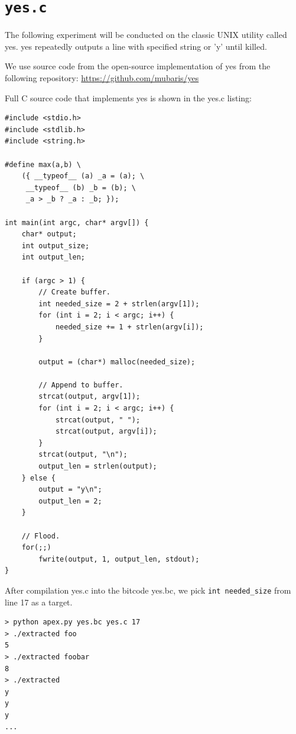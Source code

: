 \documentclass[12pt, twoside]{fithesis2}
\renewcommand{\_}{\leavevmode \kern0.07em\vbox{\hrule width0.4em}}
\begin{document}
\section{\texttt{yes.c}}
\label{sec:exp_yes}

The following experiment will be conducted on the classic UNIX utility called
yes.
yes repeatedly outputs a line with specified string or 'y' until
killed.

We use source code from the open-source implementation of yes
from the following repository: \url{https://github.com/mubaris/yes}

Full C source code that implements yes is shown in the yes.c listing:

\begin{verbatim}
#include <stdio.h>
#include <stdlib.h>
#include <string.h>

#define max(a,b) \
    ({ __typeof__ (a) _a = (a); \
     __typeof__ (b) _b = (b); \
     _a > _b ? _a : _b; });

int main(int argc, char* argv[]) {
    char* output;
    int output_size;
    int output_len;

    if (argc > 1) {
        // Create buffer.
        int needed_size = 2 + strlen(argv[1]);
        for (int i = 2; i < argc; i++) {
            needed_size += 1 + strlen(argv[i]);
        }

        output = (char*) malloc(needed_size);

        // Append to buffer.
        strcat(output, argv[1]);
        for (int i = 2; i < argc; i++) {
            strcat(output, " ");
            strcat(output, argv[i]);
        }
        strcat(output, "\n");
        output_len = strlen(output);
    } else {
        output = "y\n";
        output_len = 2;
    }

    // Flood.
    for(;;)
        fwrite(output, 1, output_len, stdout);
}
\end{verbatim}

After compilation yes.c into the bitcode yes.bc, we pick
\texttt{int needed_size} from line 17 as a target.

\begin{verbatim}
> python apex.py yes.bc yes.c 17
> ./extracted foo
5
> ./extracted foobar
8
> ./extracted
y
y
y
...
\end{verbatim}
\end{document}
